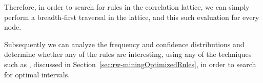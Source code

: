 Therefore, in order to search for rules in the correlation lattice, we can simply perform a breadth-first traversal in
the lattice, and this such evaluation for every node. 

Subsequently we can analyze the frequency and confidence distributions and determine whether any of the rules are
interesting, using any of the techniques such as \citet{Brin99miningoptimized}, discussed
in Section~\ref{sec:rw-miningOptimizedRules}, in order to search for optimal intervals.
